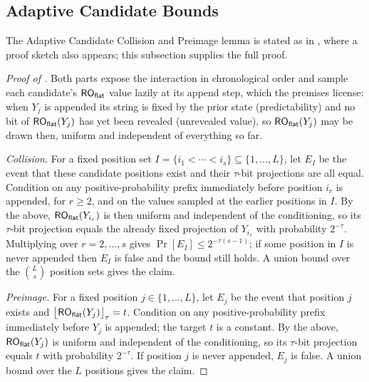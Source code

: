 \subsection{Adaptive Candidate Bounds}
\label{app:lem-candidate-collisions}

The Adaptive Candidate Collision and Preimage lemma is stated as
 in ,
where a proof sketch also appears; this subsection supplies the full
proof.

\begin{proof}[Proof of ]
Both parts expose the interaction in chronological order and sample each
candidate's $\mathsf{RO}_{\mathsf{flat}}$ value lazily at its append step, which the premises
license: when $Y_j$ is appended its string is fixed by the prior state
(predictability) and no bit of $\mathsf{RO}_{\mathsf{flat}}(Y_j)$ has yet been
revealed (unrevealed value), so $\mathsf{RO}_{\mathsf{flat}}(Y_j)$ may be drawn then, uniform
and independent of everything so far.

\emph{Collision.} For a fixed position set $I = \{i_1 < \cdots < i_s\}
\subseteq \{1,\dots,L\}$, let $E_I$ be the event that these candidate
positions exist and their $\tau$-bit projections are all equal. Condition
on any positive-probability prefix immediately before position $i_r$ is
appended, for $r \geq 2$, and on the values sampled at the earlier
positions in $I$. By the above, $\mathsf{RO}_{\mathsf{flat}}(Y_{i_r})$ is then uniform and
independent of the conditioning, so its $\tau$-bit projection equals the
already fixed projection of $Y_{i_1}$ with probability $2^{-\tau}$.
Multiplying over $r = 2,\dots,s$ gives $\Pr[E_I] \leq 2^{-\tau(s-1)}$; if
some position in $I$ is never appended then $E_I$ is false and the bound
still holds. A union bound over the $\binom{L}{s}$ position sets gives
the claim.

\emph{Preimage.} For a fixed position $j \in \{1,\dots,L\}$, let $E_j$
be the event that position $j$ exists and
$\bigl\lfloor \mathsf{RO}_{\mathsf{flat}}(Y_j) \bigr\rfloor_\tau = t$. Condition on any
positive-probability prefix immediately before $Y_j$ is appended; the
target $t$ is a constant. By the above, $\mathsf{RO}_{\mathsf{flat}}(Y_j)$ is uniform and
independent of the conditioning, so its $\tau$-bit projection equals $t$
with probability $2^{-\tau}$. If position $j$ is never appended, $E_j$ is
false. A union bound over the $L$ positions gives the claim.


\end{proof}

